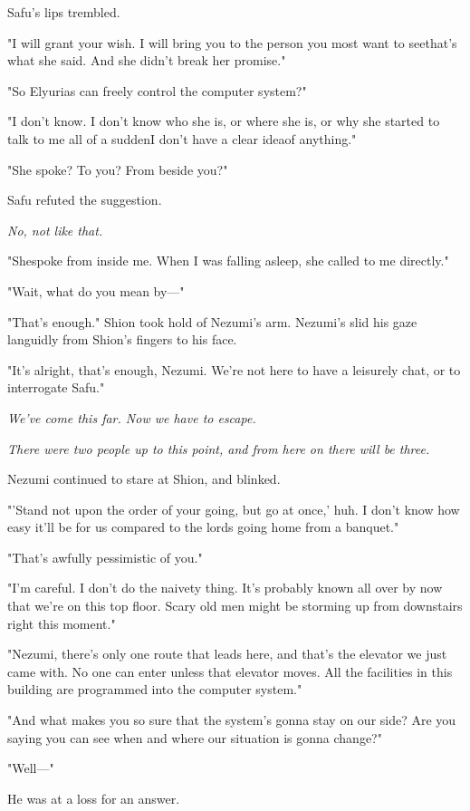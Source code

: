 Safu's lips trembled.

"I will grant your wish. I will bring you to the person you most want to
see\el that's what she said. And she didn't break her promise."

"So Elyurias can freely control the computer system?"

"I don't know. I don't know who she is, or where she is, or why she
started to talk to me all of a sudden\el I don't have a clear idea\el of
anything."

"She spoke? To you? From beside you?"

Safu refuted the suggestion.

\emph{No, not like that.}

"She\el spoke from inside me. When I was falling asleep, she called to
me directly."

"Wait, what do you mean by---"

"That's enough." Shion took hold of Nezumi's arm. Nezumi's slid his gaze
languidly from Shion's fingers to his face.

"It's alright, that's enough, Nezumi. We're not here to have a leisurely
chat, or to interrogate Safu."

\emph{We've come this far. Now we have to escape.}

\emph{There were two people up to this point, and from here on there will be
three.}

Nezumi continued to stare at Shion, and blinked.

"'Stand not upon the order of your going, but go at once,' huh. I
don't know how easy it'll be for us compared to the lords going home
from a banquet."

"That's awfully pessimistic of you."

"I'm careful. I don't do the naivety thing. It's probably known all over
by now that we're on this top floor. Scary old men might be storming up
from downstairs right this moment."

"Nezumi, there's only one route that leads here, and that's the elevator
we just came with. No one can enter unless that elevator moves. All the
facilities in this building are programmed into the computer system."

"And what makes you so sure that the system's gonna stay on our side?
Are you saying you can see when and where our situation is gonna
change?"

"Well---"

He was at a loss for an answer.

